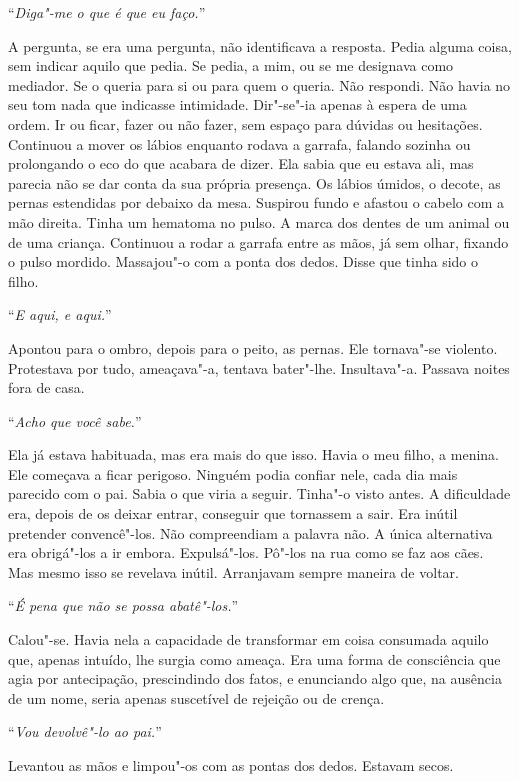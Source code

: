 ``\emph{Diga"-me o que é que eu faço.}''

A pergunta, se era uma pergunta, não identificava a resposta. Pedia
alguma coisa, sem indicar aquilo que pedia. Se pedia, a mim, ou se me
designava como mediador. Se o queria para si ou para quem o queria. Não
respondi. Não havia no seu tom nada que indicasse intimidade.
Dir"-se"-ia apenas à espera de uma ordem. Ir ou ficar, fazer ou não
fazer, sem espaço para dúvidas ou hesitações. Continuou a mover os
lábios enquanto rodava a garrafa, falando sozinha ou prolongando o eco
do que acabara de dizer. Ela sabia que eu estava ali, mas parecia não se
dar conta da sua própria presença. Os lábios úmidos, o decote, as
pernas estendidas por debaixo da mesa. Suspirou fundo e afastou o cabelo
com a mão direita. Tinha um hematoma no pulso. A marca dos dentes de um
animal ou de uma criança. Continuou a rodar a garrafa entre as mãos, já
sem olhar, fixando o pulso mordido. Massajou"-o com a ponta dos dedos.
Disse que tinha sido o filho.

``\emph{E aqui, e aqui.}''

Apontou para o ombro, depois para o peito, as pernas. Ele tornava"-se
violento. Protestava por tudo, ameaçava"-a, tentava bater"-lhe.
Insultava"-a. Passava noites fora de casa.

``\emph{Acho que você sabe.}''

Ela já estava habituada, mas era mais do que isso. Havia o meu filho, a
menina. Ele começava a ficar perigoso. Ninguém podia confiar nele, cada
dia mais parecido com o pai. Sabia o que viria a seguir. Tinha"-o visto
antes. A dificuldade era, depois de os deixar entrar, conseguir que
tornassem a sair. Era inútil pretender convencê"-los. Não compreendiam a
palavra não. A única alternativa era obrigá"-los a ir embora.
Expulsá"-los. Pô"-los na rua como se faz aos cães. Mas mesmo isso se
revelava inútil. Arranjavam sempre maneira de voltar.

``\emph{É pena que não se possa abatê"-los.}''

Calou"-se. Havia nela a capacidade de transformar em coisa consumada
aquilo que, apenas intuído, lhe surgia como ameaça. Era uma forma de
consciência que agia por antecipação, prescindindo dos fatos, e
enunciando algo que, na ausência de um nome, seria apenas suscetível de
rejeição ou de crença.

``\emph{Vou devolvê"-lo ao pai.}''

Levantou as mãos e limpou"-os com as pontas dos dedos. Estavam secos.

